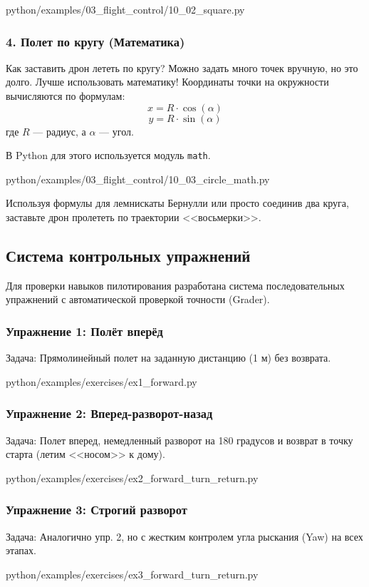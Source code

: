 \begin{codefile}[python]{python/examples/03_flight_control/10_02_square.py}
\end{codefile}

\subsubsection*{4. Полет по кругу (Математика)}
Как заставить дрон лететь по кругу? Можно задать много точек вручную, но это долго. Лучше использовать математику!
Координаты точки на окружности вычисляются по формулам:
\[ x = R \cdot \cos(\alpha) \]
\[ y = R \cdot \sin(\alpha) \]
где $R$ — радиус, а $\alpha$ — угол.

В Python для этого используется модуль \texttt{math}.

\begin{codefile}[python]{python/examples/03_flight_control/10_03_circle_math.py}
\end{codefile}

\begin{taskbox}[Восьмерка]
Используя формулы для лемнискаты Бернулли или просто соединив два круга, заставьте дрон пролететь по траектории <<восьмерки>>.
\end{taskbox}

\newpage
\subsection{Система контрольных упражнений}
Для проверки навыков пилотирования разработана система последовательных упражнений с автоматической проверкой точности (Grader).

\subsubsection*{Упражнение 1: Полёт вперёд}
Задача: Прямолинейный полет на заданную дистанцию (1 м) без возврата.
\begin{codefile}[python]{python/examples/exercises/ex1_forward.py}
\end{codefile}

\subsubsection*{Упражнение 2: Вперед-разворот-назад}
Задача: Полет вперед, немедленный разворот на 180 градусов и возврат в точку старта (летим <<носом>> к дому).
\begin{codefile}[python]{python/examples/exercises/ex2_forward_turn_return.py}
\end{codefile}

\subsubsection*{Упражнение 3: Строгий разворот}
Задача: Аналогично упр. 2, но с жестким контролем угла рыскания (Yaw) на всех этапах.
\begin{codefile}[python]{python/examples/exercises/ex3_forward_turn_return.py}
\end{codefile}
